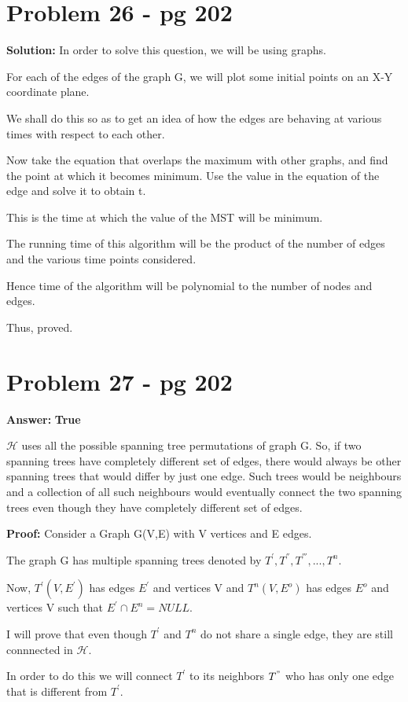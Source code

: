 \documentclass[12pt]{article}
\begin{document}
\section{Problem 26 - pg 202}
\textbf{Solution:}
In order to solve this question, we will be using graphs.

For each of the edges of the graph G, we will plot some initial points on an X-Y coordinate plane.

We shall do this so as to get an idea of how the edges are behaving at various times with respect to each other.

Now take the equation that overlaps the maximum with other graphs, and find the point at which it becomes minimum. Use the value in the equation of the edge and solve it to obtain t. 

This is the time at which the value of the MST will be minimum.

The running time of this algorithm will be the product of the number of edges and the various time points considered.

Hence time of the algorithm will be polynomial to the number of nodes and edges. 

Thus, proved.

\section{Problem 27 - pg 202}
\textbf{Answer:}
\textbf{True}

$\mathcal{H}$ uses all the possible spanning tree permutations of graph G. So, if two spanning trees have completely different set of edges, there would always be other spanning trees that would differ by just one edge. Such trees would be neighbours and a collection of all such neighbours would eventually connect the two spanning trees even though they have completely different set of edges.

\textbf{Proof:}
Consider a Graph G(V,E) with V vertices and E edges.

The graph G has multiple spanning trees denoted by $T^{'},T^{''},T^{'''},...,T^{n}$. 

Now, $T^{'}(V,E^{'})$ has edges $E^{'}$ and vertices V and $T^{n}(V,E^{o})$ has edges $E^{o}$ and vertices V such that $E^{'} \cap E^{n} = NULL$.

I will prove that even though $T^{'} $ and  $T^{n}$ do not share a single edge, they are still connnected in $\mathcal{H}$.

In order to do this we will connect $T^{'} $  to its neighbors $T^{"} $ who has only one edge that is different from $T^{'} $.
\end{document}
